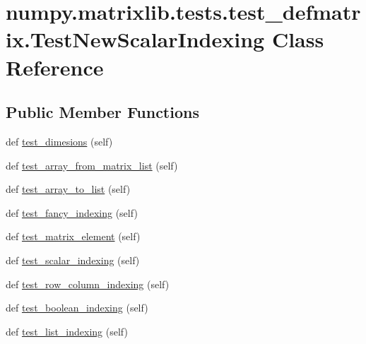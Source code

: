 \hypertarget{classnumpy_1_1matrixlib_1_1tests_1_1test__defmatrix_1_1TestNewScalarIndexing}{}\section{numpy.\+matrixlib.\+tests.\+test\+\_\+defmatrix.\+Test\+New\+Scalar\+Indexing Class Reference}
\label{classnumpy_1_1matrixlib_1_1tests_1_1test__defmatrix_1_1TestNewScalarIndexing}
\subsection*{Public Member Functions}
\begin{DoxyCompactItemize}
\item 
def \hyperlink{classnumpy_1_1matrixlib_1_1tests_1_1test__defmatrix_1_1TestNewScalarIndexing_a9f54993fb6f05242da3329e7988a98ea}{test\+\_\+dimesions} (self)
\item 
def \hyperlink{classnumpy_1_1matrixlib_1_1tests_1_1test__defmatrix_1_1TestNewScalarIndexing_a73d520318e428ea6b72c5038944ba71d}{test\+\_\+array\+\_\+from\+\_\+matrix\+\_\+list} (self)
\item 
def \hyperlink{classnumpy_1_1matrixlib_1_1tests_1_1test__defmatrix_1_1TestNewScalarIndexing_a67d09dd5574a416dddb5c282afb7f5e2}{test\+\_\+array\+\_\+to\+\_\+list} (self)
\item 
def \hyperlink{classnumpy_1_1matrixlib_1_1tests_1_1test__defmatrix_1_1TestNewScalarIndexing_a9c6c238e907a5e91e166301b9d6686ea}{test\+\_\+fancy\+\_\+indexing} (self)
\item 
def \hyperlink{classnumpy_1_1matrixlib_1_1tests_1_1test__defmatrix_1_1TestNewScalarIndexing_aba925b809388acee0b4e76613db2b720}{test\+\_\+matrix\+\_\+element} (self)
\item 
def \hyperlink{classnumpy_1_1matrixlib_1_1tests_1_1test__defmatrix_1_1TestNewScalarIndexing_a306ce24e4fdbeefca63499a65b26a4b7}{test\+\_\+scalar\+\_\+indexing} (self)
\item 
def \hyperlink{classnumpy_1_1matrixlib_1_1tests_1_1test__defmatrix_1_1TestNewScalarIndexing_aa1bb2964b0ad629a07faf7722b82dd7c}{test\+\_\+row\+\_\+column\+\_\+indexing} (self)
\item 
def \hyperlink{classnumpy_1_1matrixlib_1_1tests_1_1test__defmatrix_1_1TestNewScalarIndexing_ad589ca52ccf193097fac0bfa660e7ea8}{test\+\_\+boolean\+\_\+indexing} (self)
\item 
def \hyperlink{classnumpy_1_1matrixlib_1_1tests_1_1test__defmatrix_1_1TestNewScalarIndexing_a9d67ee45b0dd41dbd7bed62c8a8a8934}{test\+\_\+list\+\_\+indexing} (self)
\end{DoxyCompactItemize}
